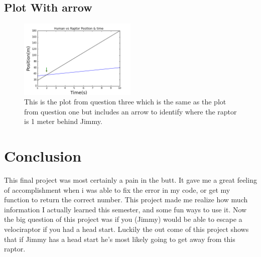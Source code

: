 \documentclass[twocolumn]{revtex4}
\begin{document}
\subsection{Plot With arrow}
\begin{figure}[h]

\label{fig:Position vs. Time with arrow}
\includegraphics[width=0.5\textwidth]{Jimmy_Graph_Arrow.png}
\caption{This is the plot from question three which is the same as the plot from question one but includes an arrow to identify where the raptor is 1 meter behind Jimmy.}
\end{figure}

\section{Conclusion}
This final project was most certainly a pain in the butt. It gave me a great feeling of accomplishment when i was able to fix the error in my code, or get my function to return the correct number. This project made me realize how much information I actually learned this semester, and some fun ways to use it. Now the big question of this project was if you (Jimmy) would be able to escape a velociraptor if you had a head start. Luckily the out come of this project shows that if Jimmy has a head start he's most likely going to get away from this raptor. 
\end{document}
